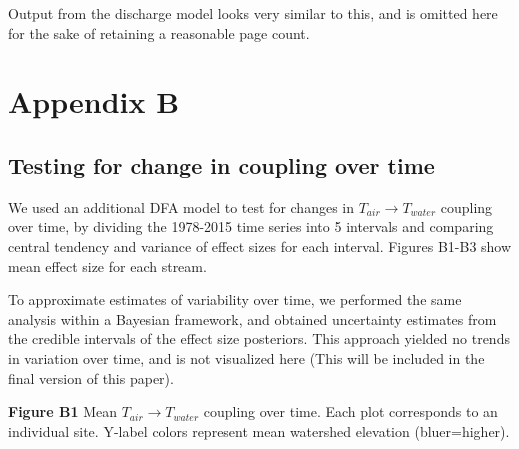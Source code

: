 \documentclass[notitlepage]{article}
\begin{document}
Output from the discharge model looks very similar to this, and is omitted here for the sake of retaining a reasonable page count.
\clearpage

\section*{Appendix B}

\subsection*{Testing for change in coupling over time}

We used an additional DFA model to test for changes in $T_{air}\rightarrow T_{water}$ coupling over time, by dividing the 1978-2015 time series into 5 intervals and comparing central tendency and variance of effect sizes for each interval. Figures B1-B3 show mean effect size for each stream.

To approximate estimates of variability over time, we performed the same analysis within a Bayesian framework, and obtained uncertainty estimates from the credible intervals of the effect size posteriors. This approach yielded no trends in variation over time, and is not visualized here (This will be included in the final version of this paper).

\begin{center}
\textbf{Figure B1} Mean $T_{air}\rightarrow T_{water}$ coupling over time. Each plot corresponds to an individual site. Y-label colors represent mean watershed elevation (bluer=higher).
\end{center}
\end{document}
